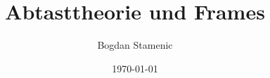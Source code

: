 

\newcommand{\FormelsammlungTitel}{Abtasttheorie und Frames}
\newcommand{\FormelsammlungAutor}{Bogdan Stamenic}
\setcounter{tocdepth}{2} %


	\title{\FormelsammlungTitel}
	\author{\FormelsammlungAutor}
	\date{\today}
	\begin{multicols*}{3}
			\maketitle
			\tableofcontents
		
		
		
	\end{multicols*}

